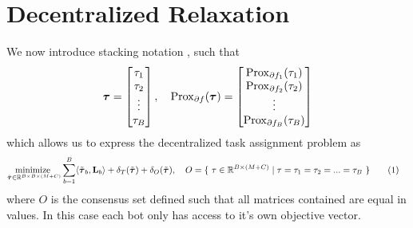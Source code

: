 \documentclass{article}
\newcommand\numberthis{\addtocounter{equation}{1}\tag{\theequation}}
\newcommand{\sectiontype}{}
\begin{document}
\section*{Decentralized Relaxation}
\renewcommand{\sectiontype}{Decentralized Relaxation}
We now introduce stacking notation \cite{ryu2022large}, such that 
\begin{align*}
    \boldsymbol{\tau} = \begin{bmatrix}
        \tau_1 \\ \tau_2 \\ \vdots \\ \tau_B
    \end{bmatrix},\quad
    \mathrm{Prox}_{\partial f}(\boldsymbol{\tau})
    =
    \begin{bmatrix}
        \mathrm{Prox}_{\partial f_1}(\tau_1) \\ \mathrm{Prox}_{\partial f_2}(\tau_2) \\ \vdots \\ \mathrm{Prox}_{\partial f_B}(\tau_B)
    \end{bmatrix}
\end{align*}
which allows us to express the decentralized task assignment problem as 
\begin{align*}
    \underset{\tilde{\vtau} \in \RR^{B \times B \times (M+C)}}{\text{minimize }} & \sum^B_{b=1}\langle \tilde{\vtau}_b, \vL_b \rangle + \delta_T(\tilde{\vtau}) + \delta_O(\tilde{\vtau}),\quad
    O = \{\ \tau \in \RR^{B\times (M+C)} \mid \tau = \tau_1 = \tau_2 = ... = \tau_B\ \}
    \numberthis \label{eq:objective_function_alt}
\end{align*}
where $O$ is the consensus set defined such that all matrices contained are equal in values. In this case each bot only has access to it's own objective vector. \newline
\end{document}
